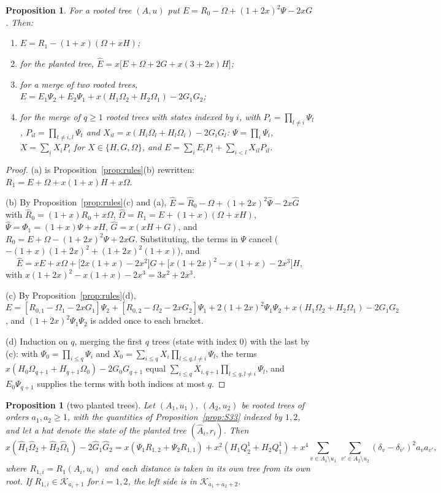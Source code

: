\documentclass[11pt]{amsart}
\newtheorem{proposition}[theorem]{Proposition}
\theoremstyle{definition}
\theoremstyle{remark}
\newcommand{\K}{\mathcal K}
\begin{document}
\begin{proposition}\label{prop:S34}
For a rooted tree $(A,u)$ put $E=R_0-\Omega+(1+2x)^2\Psi-2xG$. Then:
\begin{enumerate}
\item[(a)] $E=R_1-(1+x)(\Omega+xH)$;
\item[(b)] for the planted tree, $\hat E=x\bigl[E+\Omega+2G+x(3+2x)H\bigr]$;
\item[(c)] for a merge of two rooted trees,
$E=E_1\Psi_2+E_2\Psi_1+x(H_1\Omega_2+H_2\Omega_1)-2G_1G_2$;
\item[(d)] for the merge of $q\ge1$ rooted trees with states indexed by $i$,
with $P_i=\prod_{l\ne i}\Psi_l$, $P_{il}=\prod_{t\ne i,l}\Psi_t$ and
$X_{il}=x(H_i\Omega_l+H_l\Omega_i)-2G_iG_l$:
$\Psi=\prod_i\Psi_i$, $X=\sum_iX_iP_i$ for $X\in\{H,G,\Omega\}$, and
$E=\sum_iE_iP_i+\sum_{i<l}X_{il}P_{il}$.
\end{enumerate}
\end{proposition}

\begin{proof}
(a) is Proposition~\ref{prop:rules}(b) rewritten:
$R_1=E+\Omega+x(1+x)H+x\Omega$.

(b) By Proposition~\ref{prop:rules}(c) and (a),
$\hat E=\hat R_0-\hat\Omega+(1+2x)^2\hat\Psi-2x\hat G$ with
$\hat R_0=(1+x)R_0+x\Omega$, $\hat\Omega=R_1=E+(1+x)(\Omega+xH)$,
$\hat\Psi=\Phi_1=(1+x)\Psi+xH$, $\hat G=x(xH+G)$, and
$R_0=E+\Omega-(1+2x)^2\Psi+2xG$. Substituting, the terms in $\Psi$ cancel
($-(1+x)(1+2x)^2+(1+2x)^2(1+x)$), and
\[
\hat E=xE+x\Omega+\bigl[2x(1+x)-2x^2\bigr]G+\bigl[x(1+2x)^2-x(1+x)-2x^3\bigr]H ,
\]
with $x(1+2x)^2-x(1+x)-2x^3=3x^2+2x^3$.

(c) By Proposition~\ref{prop:rules}(d),
$E=[R_{0,1}-\Omega_1-2xG_1]\Psi_2+[R_{0,2}-\Omega_2-2xG_2]\Psi_1+2(1+2x)^2\Psi_1\Psi_2+x(H_1\Omega_2+H_2\Omega_1)-2G_1G_2$,
and $(1+2x)^2\Psi_1\Psi_2$ is added once to each bracket.

(d) Induction on $q$, merging the first $q$ trees (state with index $0$) with
the last by (c): with $\Psi_0=\prod_{i\le q}\Psi_i$ and
$X_0=\sum_{i\le q}X_i\prod_{l\le q,l\ne i}\Psi_l$, the terms
$x(H_0\Omega_{q+1}+H_{q+1}\Omega_0)-2G_0G_{q+1}$ equal
$\sum_{i\le q}X_{i,q+1}\prod_{l\le q,l\ne i}\Psi_l$, and $E_0\Psi_{q+1}$
supplies the terms with both indices at most $q$.
\end{proof}

\begin{proposition}[two planted trees]\label{prop:S35}
Let $(A_1,u_1)$, $(A_2,u_2)$ be rooted trees of orders $a_1,a_2\ge1$, with the
quantities of Proposition~\ref{prop:S33} indexed by $1,2$, and let a hat
denote the state of the planted tree $(\hat A_i,r_i)$. Then
\[
x(\hat H_1\hat\Omega_2+\hat H_2\hat\Omega_1)-2\hat G_1\hat G_2
=x(\Psi_1R_{1,2}+\Psi_2R_{1,1})+x^2(H_1Q^1_2+H_2Q^1_1)
+x^4\sum_{v\in A_1\setminus u_1}\ \sum_{v'\in A_2\setminus u_2}(\delta_v-\delta_{v'})^2a_va_{v'},
\]
where $R_{1,i}=R_1(A_i,u_i)$ and each distance is taken in its own tree from
its own root. If $R_{1,i}\in\K_{a_i+1}$ for $i=1,2$, the left side is in
$\K_{a_1+a_2+2}$.
\end{proposition}
\end{document}
